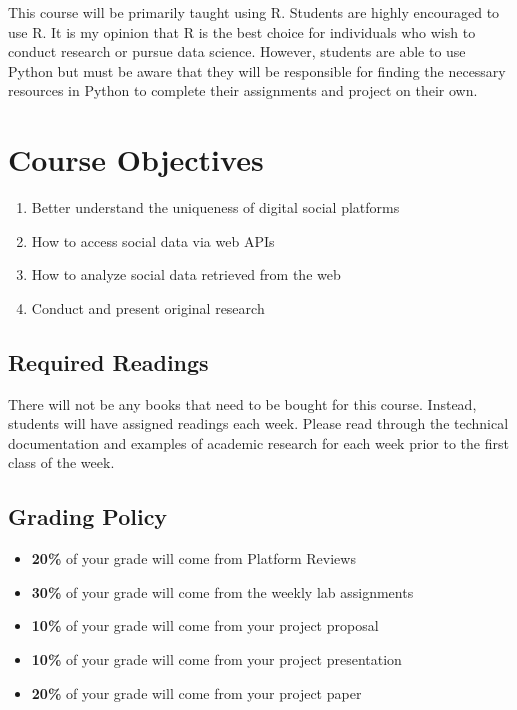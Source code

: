\documentclass[11pt,]{article}
\begin{document}
This course will be primarily taught using R. Students are highly
encouraged to use R. It is my opinion that R is the best choice for
individuals who wish to conduct research or pursue data science.
However, students are able to use Python but must be aware that they
will be responsible for finding the necessary resources in Python to
complete their assignments and project on their own.

\hypertarget{course-objectives}{%
\section{Course Objectives}\label{course-objectives}}

\begin{enumerate}
\def\labelenumi{\arabic{enumi}.}
\item
  Better understand the uniqueness of digital social platforms
\item
  How to access social data via web APIs
\item
  How to analyze social data retrieved from the web
\item
  Conduct and present original research
\end{enumerate}

\hypertarget{required-readings}{%
\subsection{Required Readings}\label{required-readings}}

There will not be any books that need to be bought for this course.
Instead, students will have assigned readings each week. Please read
through the technical documentation and examples of academic research
for each week prior to the first class of the week.

\hypertarget{grading-policy}{%
\subsection{Grading Policy}\label{grading-policy}}

\begin{itemize}
\item
  \textbf{20\%} of your grade will come from Platform Reviews
\item
  \textbf{30\%} of your grade will come from the weekly lab assignments
\item
  \textbf{10\%} of your grade will come from your project proposal
\item
  \textbf{10\%} of your grade will come from your project presentation
\item
  \textbf{20\%} of your grade will come from your project paper
\end{itemize}
\end{document}
